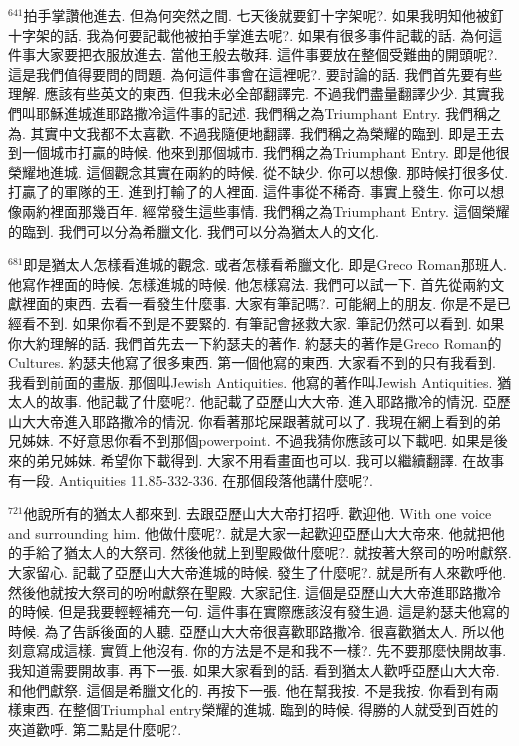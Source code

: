 \documentclass{book}
\begin{document}
$^{641}$拍手掌讚他進去.
但為何突然之間.
七天後就要釘十字架呢?.
如果我明知他被釘十字架的話.
我為何要記載他被拍手掌進去呢?.
如果有很多事件記載的話.
為何這件事大家要把衣服放進去.
當他王般去敬拜.
這件事要放在整個受難曲的開頭呢?.
這是我們值得要問的問題.
為何這件事會在這裡呢?.
要討論的話.
我們首先要有些理解.
應該有些英文的東西.
但我未必全部翻譯完.
不過我們盡量翻譯少少.
其實我們叫耶穌進城進耶路撒冷這件事的記述.
我們稱之為Triumphant Entry.
我們稱之為.
其實中文我都不太喜歡.
不過我隨便地翻譯.
我們稱之為榮耀的臨到.
即是王去到一個城市打贏的時候.
他來到那個城市.
我們稱之為Triumphant Entry.
即是他很榮耀地進城.
這個觀念其實在兩約的時候.
從不缺少.
你可以想像.
那時候打很多仗.
打贏了的軍隊的王.
進到打輸了的人裡面.
這件事從不稀奇.
事實上發生.
你可以想像兩約裡面那幾百年.
經常發生這些事情.
我們稱之為Triumphant Entry.
這個榮耀的臨到.
我們可以分為希臘文化.
我們可以分為猶太人的文化.

$^{681}$即是猶太人怎樣看進城的觀念.
或者怎樣看希臘文化.
即是Greco Roman那班人.
他寫作裡面的時候.
怎樣進城的時候.
他怎樣寫法.
我們可以試一下.
首先從兩約文獻裡面的東西.
去看一看發生什麼事.
大家有筆記嗎?.
可能網上的朋友.
你是不是已經看不到.
如果你看不到是不要緊的.
有筆記會拯救大家.
筆記仍然可以看到.
如果你大約理解的話.
我們首先去一下約瑟夫的著作.
約瑟夫的著作是Greco Roman的Cultures.
約瑟夫他寫了很多東西.
第一個他寫的東西.
大家看不到的只有我看到.
我看到前面的畫版.
那個叫Jewish Antiquities.
他寫的著作叫Jewish Antiquities.
猶太人的故事.
他記載了什麼呢?.
他記載了亞歷山大大帝.
進入耶路撒冷的情況.
亞歷山大大帝進入耶路撒冷的情況.
你看著那坨屎跟著就可以了.
我現在網上看到的弟兄姊妹.
不好意思你看不到那個powerpoint.
不過我猜你應該可以下載吧.
如果是後來的弟兄姊妹.
希望你下載得到.
大家不用看畫面也可以.
我可以繼續翻譯.
在故事有一段.
Antiquities 11.85-332-336.
在那個段落他講什麼呢?.

$^{721}$他說所有的猶太人都來到.
去跟亞歷山大大帝打招呼.
歡迎他.
With one voice and surrounding him.
他做什麼呢?.
就是大家一起歡迎亞歷山大大帝來.
他就把他的手給了猶太人的大祭司.
然後他就上到聖殿做什麼呢?.
就按著大祭司的吩咐獻祭.
大家留心.
記載了亞歷山大大帝進城的時候.
發生了什麼呢?.
就是所有人來歡呼他.
然後他就按大祭司的吩咐獻祭在聖殿.
大家記住.
這個是亞歷山大大帝進耶路撒冷的時候.
但是我要輕輕補充一句.
這件事在實際應該沒有發生過.
這是約瑟夫他寫的時候.
為了告訴後面的人聽.
亞歷山大大帝很喜歡耶路撒冷.
很喜歡猶太人.
所以他刻意寫成這樣.
實質上他沒有.
你的方法是不是和我不一樣?.
先不要那麼快開故事.
我知道需要開故事.
再下一張.
如果大家看到的話.
看到猶太人歡呼亞歷山大大帝.
和他們獻祭.
這個是希臘文化的.
再按下一張.
他在幫我按.
不是我按.
你看到有兩樣東西.
在整個Triumphal entry榮耀的進城.
臨到的時候.
得勝的人就受到百姓的夾道歡呼.
第二點是什麼呢?.
\end{document}
